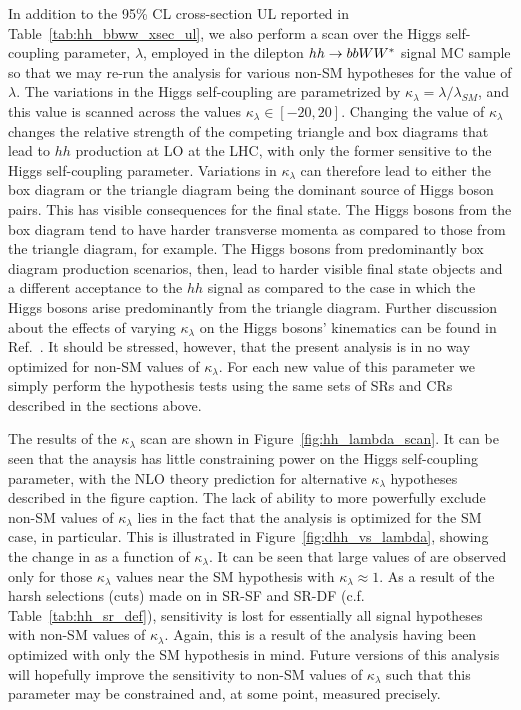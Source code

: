 In addition to the 95\% CL cross-section UL reported in Table~\ref{tab:hh_bbww_xsec_ul}, we also perform
a scan over the Higgs self-coupling parameter, $\lambda$, employed in the dilepton $hh \rightarrow bbWW^*$ signal MC sample
so that we may re-run the analysis for various non-SM hypotheses for the value of $\lambda$.
The variations in the Higgs self-coupling are parametrized by $\kappa_{\lambda} = \lambda / \lambda_{SM}$, and this
value is scanned across the values $\kappa_{\lambda} \in [-20, 20]$.
Changing the value of $\kappa_{\lambda}$ changes the relative strength of the competing triangle
and box diagrams that lead to $hh$ production at LO at the LHC, with only the former sensitive to
the Higgs self-coupling parameter.
Variations in $\kappa_{\lambda}$ can therefore lead to either the box diagram or the triangle diagram being the dominant source of Higgs boson pairs.
This has visible consequences for the final state.
The Higgs bosons from the box diagram tend to have harder transverse momenta
as compared to those from the triangle diagram, for example.
The Higgs bosons from predominantly box diagram production scenarios, then, lead to harder visible final state objects
and a different acceptance to the $hh$ signal as compared to the case in which the Higgs bosons arise predominantly
from the triangle diagram.
Further discussion about the effects of varying $\kappa_{\lambda}$ on the Higgs bosons' kinematics can
be found in Ref.~\cite{HHComb36}.
It should be stressed, however, that the present analysis is in no way optimized for non-SM values of $\kappa_{\lambda}$.
For each new value of this parameter we simply perform the hypothesis tests using the same
sets of SRs and CRs described in the sections above.

The results of the $\kappa_{\lambda}$ scan are shown in Figure~\ref{fig:hh_lambda_scan}.
It can be seen that the anaysis has little constraining power on the Higgs self-coupling parameter, with
the NLO theory prediction for alternative $\kappa_{\lambda}$ hypotheses described in the figure caption.
The lack of ability to more powerfully exclude non-SM values of $\kappa_{\lambda}$ lies in the
fact that the analysis is optimized for the SM case, in particular.
This is illustrated in Figure~\ref{fig:dhh_vs_lambda}, showing the change in \dhh as a function
of $\kappa_{\lambda}$.
It can be seen that large values of \dhh are observed only for those $\kappa_{\lambda}$ values near
the SM hypothesis with $\kappa_{\lambda} \approx 1$.
As a result of the harsh selections (cuts) made on \dhh in SR-SF and SR-DF (c.f. Table~\ref{tab:hh_sr_def}),
sensitivity is lost for essentially all signal hypotheses with non-SM values of $\kappa_{\lambda}$.
Again, this is a result of the analysis having been optimized with only the SM hypothesis in mind.
Future versions of this analysis will hopefully improve the sensitivity to non-SM values of $\kappa_{\lambda}$
such that this parameter may be constrained and, at some point, measured precisely.

